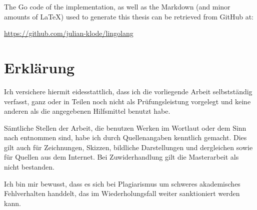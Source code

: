 \vskip1cm
The Go code of the implementation, as well as the Markdown (and minor amounts of \LaTeX) used to generate
this thesis can be retrieved from GitHub at:

\url{https://github.com/julian-klode/lingolang}


\chapter*{Erklärung}
\begin{otherlanguage}{ngerman}
Ich versichere hiermit eidesstattlich, dass ich die vorliegende Arbeit
selbstständig verfasst, ganz oder in Teilen noch nicht als
Prüfungsleistung vorgelegt und keine anderen als die angegebenen
Hilfsmittel benutzt habe.

Sämtliche Stellen der Arbeit, die benutzen Werken im Wortlaut oder dem
Sinn nach entnommen sind, habe ich durch Quellenangaben kenntlich
gemacht. Dies gilt auch für Zeichnungen, Skizzen, bildliche
Darstellungen und dergleichen sowie für Quellen aus dem Internet. Bei
Zuwiderhandlung gilt die Masterarbeit als nicht bestanden.

Ich bin mir bewusst, dass es sich bei Plagiarismus um schweres
akademisches Fehlverhalten handdelt, das im Wiederholungsfall weiter
sanktioniert werden kann.

{
    \vskip3cm
    \par\noindent\makebox[7cm]{\hrulefill} \hfill\makebox[7cm]{\hrulefill}
    \par\noindent{}      \hfill{}
}
\end{otherlanguage}

